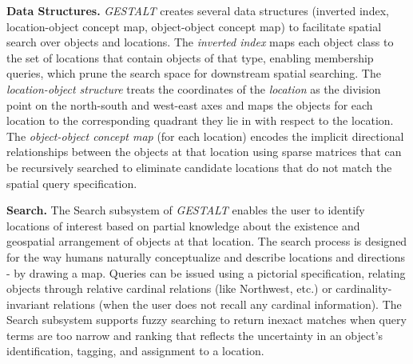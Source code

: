 \textbf{Data Structures.}
\emph{GESTALT} creates several data structures (inverted index, location-object concept map, object-object concept map) to facilitate spatial search over objects and locations. 
The \textit{inverted index} maps each object class to the set of locations that contain objects of that type, enabling membership queries, which prune the search space for downstream spatial searching. 
The \textit{location-object structure} treats the coordinates of the \textit{location} as the division point on the north-south and west-east axes and maps the objects for each location to the corresponding quadrant they lie in with respect to the location.
The \textit{object-object concept map} (for each location) encodes the implicit directional relationships between the objects at that location using sparse matrices that can be recursively searched to eliminate candidate locations that do not match the spatial query specification. 

\textbf{Search.}
The Search subsystem of \emph{GESTALT} enables the user to identify locations of interest based on partial knowledge about the existence and geospatial arrangement of objects at that location. 
The search process is designed for the way humans naturally conceptualize and describe locations and directions - by drawing a map.
Queries can be issued using a pictorial specification, relating objects through relative cardinal relations (like Northwest, etc.) or cardinality-invariant relations (when the user does not recall any cardinal information).
The Search subsystem supports fuzzy searching to return inexact matches when query terms are too narrow and ranking that reflects the uncertainty in an object's identification, tagging, and assignment to a location.



